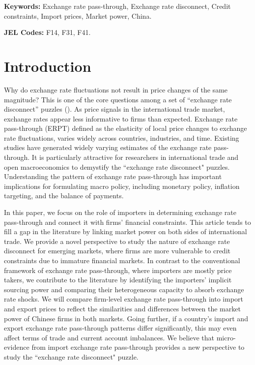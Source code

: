\textbf{Keywords:} Exchange rate pass-through, Exchange rate disconnect, Credit constraints, Import prices, Market power, China.

\textbf{JEL Codes:} F14, F31, F41.

\section{Introduction} \label{Introduction}

Why do exchange rate fluctuations not result in price changes of the same magnitude? This is one of the core questions among a set of ``exchange rate disconnect'' puzzles (\cite{obstfeld2000}). As price signals in the international trade market, exchange rates appear less informative to firms than expected. Exchange rate pass-through (ERPT) defined as the elasticity of local price changes to exchange rate fluctuations, varies widely across countries, industries, and time. Existing studies have generated widely varying estimates of the exchange rate pass-through. It is particularly attractive for researchers in international trade and open macroeconomics to demystify the ``exchange rate disconnect" puzzles. Understanding the pattern of exchange rate pass-through has important implications for formulating macro policy, including monetary policy, inflation targeting, and the balance of payments.

In this paper, we focus on the role of importers in determining exchange rate pass-through and connect it with firms' financial constraints. This article tends to fill a gap in the literature by linking market power on both sides of international trade. We provide a novel perspective to study the nature of exchange rate disconnect for emerging markets, where firms are more vulnerable to credit constraints due to immature financial markets. In contrast to the conventional framework of exchange rate pass-through, where importers are mostly price takers, we contribute to the literature by identifying the importers' implicit sourcing power and comparing their heterogeneous capacity to absorb exchange rate shocks. We will compare firm-level exchange rate pass-through into import and export prices to reflect the similarities and differences between the market power of Chinese firms in both markets. Going further, if a country's import and export exchange rate pass-through patterns differ significantly, this may even affect terms of trade and current account imbalances. We believe that micro-evidence from import exchange rate pass-through provides a new perspective to study the ``exchange rate disconnect" puzzle.

